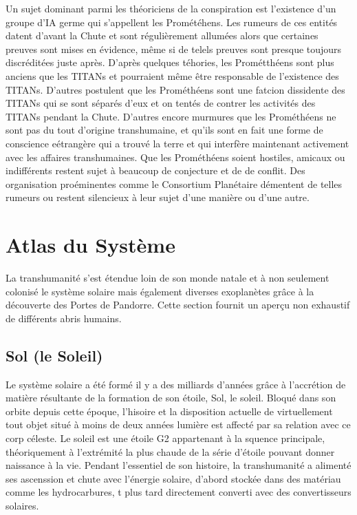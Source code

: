                                                 Un sujet dominant parmi les théoriciens de la conspiration est l'existence d'un groupe d'IA germe qui s'appellent les Prométéhens. Les rumeurs de ces entités datent d'avant la Chute et sont régulièrement allumées alors que certaines preuves sont mises en évidence, même si de telels preuves sont presque toujours discréditées juste après. D'après quelques téhories, les Prométthéens sont plus anciens que les TITANs et pourraient même être responsable de l'existence des TITANs. D'autres postulent que les Prométhéens sont une fatcion dissidente des TITANs qui se sont séparés d'eux et on tentés de contrer les activités des TITANs pendant la Chute. D'autres encore murmures que les Prométhéens ne sont pas du tout d'origine transhumaine, et qu'ils sont en fait une forme de conscience eétrangère qui a trouvé la terre et qui interfère maintenant activement avec les affaires transhumaines. Que les Prométhéens soient hostiles, amicaux ou indifférents restent sujet à beaucoup de conjecture et de de conflit. Des organisation proéminentes comme le Consortium Planétaire démentent de telles rumeurs ou restent silencieux à leur sujet d'une manière ou d'une autre. 

                                                \section{Atlas du Système} \label{sec:system-gazeteer} 

                                                La transhumanité s'est étendue loin de son monde natale et à non seulement colonisé le système solaire mais également diverses exoplanètes grâce à la découverte des Portes de Pandorre. Cette section fournit un aperçu non exhaustif de différents abris humains. 

                                                \subsection{Sol (le Soleil)} \label{sec:sol-the-sun} 

                                                Le système solaire a été formé il y a des milliards d'années grâce à l'accrétion de matière résultante de la formation de son étoile, Sol, le soleil. Bloqué dans son orbite depuis cette époque, l'hisoire et la disposition actuelle de virtuellement tout objet situé à moins de deux années lumière est affecté par sa relation avec ce corp céleste. Le soleil est une étoile G2 appartenant à la squence principale, théoriquement à l'extrémité la plus chaude de la série d'étoile pouvant donner naissance à la vie. Pendant l'essentiel de son histoire, la transhumanité a alimenté ses ascenssion et chute avec l'énergie solaire, d'abord stockée dans des matériau comme les hydrocarbures, t plus tard directement converti avec des convertisseurs solaires. 

